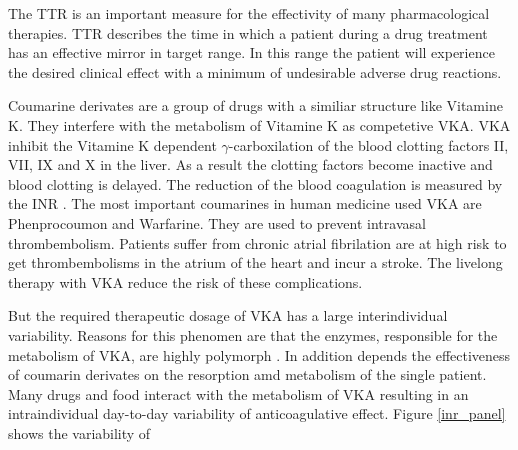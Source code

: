 The \ac{TTR} is an important measure for the effectivity of many pharmacological therapies. \ac{TTR} describes the time in which a patient during a drug treatment has an effective mirror in target range. In this range the patient will experience the desired clinical effect with a minimum of undesirable adverse drug reactions. 

Coumarine derivates are a group of drugs with a similiar structure like Vitamine K. They interfere with the metabolism of Vitamine K as competetive \ac{VKA}. \ac{VKA} inhibit the Vitamine K dependent $\gamma$-carboxilation of the blood clotting factors II, VII, IX and X in the liver. As a result the clotting factors become inactive and blood clotting is delayed. The reduction of the blood coagulation is measured by the \ac{INR} \cite{Hirsh_1998}. The most important coumarines in human medicine used \ac{VKA} are Phenprocoumon and Warfarine. They are used to prevent intravasal thrombembolism. Patients suffer from chronic atrial fibrilation are at high risk to get thrombembolisms in the atrium of the heart and incur a stroke. The livelong therapy with \ac{VKA} reduce the risk of these complications.

But the required therapeutic dosage of \ac{VKA} has a large interindividual variability. Reasons for this phenomen are that the enzymes, responsible for the metabolism of \ac{VKA}, are highly polymorph \cite{Brehm_2016,  Verhoef_2014}. In addition depends the effectiveness of coumarin derivates on the resorption amd metabolism of the single patient. Many drugs and food interact with the metabolism of \ac{VKA} resulting in an intraindividual day-to-day variability of anticoagulative effect. Figure \ref{inr_panel} shows the variability of   

